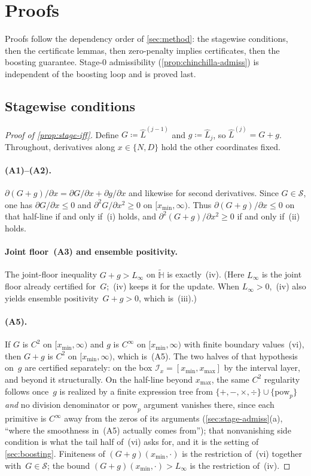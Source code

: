 \documentclass[11pt]{article}
\newcommand{\calS}{\mathcal{S}}
\newcommand{\calI}{\mathcal{I}}
\newcommand{\bbH}{\mathbb{H}}
\newcommand{\Lhat}{\hat{L}}
\theoremstyle{plain}
\theoremstyle{remark}
\begin{document}
\section{Proofs}\label{sec:proofs}
Proofs follow the dependency order of \cref{sec:method}: the stagewise conditions, then the certificate lemmas, then zero-penalty implies certificates, then the boosting guarantee.
Stage-0 admissibility (\cref{prop:chinchilla-admiss}) is independent of the boosting loop and is proved last.

\subsection{Stagewise conditions}\label{sec:stage-iff-proof}
\begin{proof}[Proof of \cref{prop:stage-iff}]
Define $G\coloneqq\Lhat^{(j-1)}$ and $g\coloneqq\Lhat_j$, so $\Lhat^{(j)}=G+g$.
Throughout, derivatives along $x\in\{N,D\}$ hold the other coordinates fixed.

\paragraph{(A1)--(A2).}
$\partial(G+g)/\partial x=\partial G/\partial x+\partial g/\partial x$ and likewise for second derivatives.
Since $G\in\calS$, one has $\partial G/\partial x\leq 0$ and $\partial^2 G/\partial x^2\geq 0$ on $[x_{\min},\infty)$.
Thus $\partial(G+g)/\partial x\leq 0$ on that half-line if and only if~(i) holds, and $\partial^2(G+g)/\partial x^2\geq 0$ if and only if~(ii) holds.

\paragraph{Joint floor~(A3) and ensemble positivity.}
The joint-floor inequality $G+g>L_\infty$ on $\widetilde{\bbH}$ is exactly~(iv).
(Here $L_\infty$ is the joint floor already certified for~$G$;~(iv) keeps it for the update.
When $L_\infty>0$,~(iv) also yields ensemble positivity~$G+g>0$, which is~(iii).)

\paragraph{(A5).}
If $G$ is $C^2$ on $[x_{\min},\infty)$ and $g$ is $C^\infty$ on $[x_{\min},\infty)$ with finite boundary values~(vi), then $G+g$ is $C^2$ on $[x_{\min},\infty)$, which is~(A5).
The two halves of that hypothesis on~$g$ are certified separately: on the box $\calI_x=[x_{\min},x_{\max}]$ by the interval layer, and beyond it structurally.
On the half-line beyond $x_{\max}$, the same $C^2$ regularity follows once~$g$ is realized by a finite expression tree from $\{+,-,\times,\div\}\cup\{\mathrm{pow}_p\}$ \emph{and} no division denominator or $\mathrm{pow}_p$ argument vanishes there, since each primitive is $C^\infty$ away from the zeros of its arguments (\cref{sec:stage-admiss}(a), ``where the smoothness in~(A5) actually comes from''); that nonvanishing side condition is what the tail half of~(vi) asks for, and it is the setting of \cref{sec:boosting}.
Finiteness of $(G+g)(x_{\min},\cdot)$ is the restriction of~(vi) together with~$G\in\calS$; the bound $(G+g)(x_{\min},\cdot)>L_\infty$ is the restriction of~(iv).


\end{proof}
\end{document}

